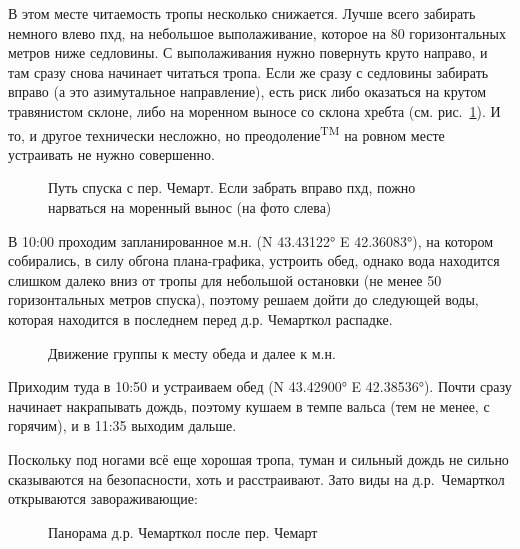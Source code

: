 В этом месте читаемость тропы несколько снижается. Лучше всего забирать немного влево пхд, на небольшое выполаживание, которое на 80 горизонтальных метров ниже седловины. С выполаживания нужно повернуть круто направо, и там сразу снова начинает читаться тропа. Если же сразу с седловины забирать вправо (а это азимутальное направление), есть риск либо оказаться на крутом травянистом склоне, либо на моренном выносе со склона хребта (см. рис.~\ref{fig:chemart_scheme}). И то, и другое технически несложно, но преодоление\textsuperscript{TM} на ровном месте устраивать не нужно совершенно.


\begin{figure}[h!]
	\centering
	\caption{Путь спуска с пер. Чемарт. Если забрать вправо пхд, пожно нарваться на моренный вынос (на фото слева)}
	\label{fig:chemart_scheme}
\end{figure}

																В 10:00 проходим запланированное м.н. (N 43.43122° E 42.36083°), на котором собирались, в силу обгона плана-графика, устроить обед, однако вода находится слишком далеко вниз от тропы для небольшой остановки (не менее 50 горизонтальных метров спуска), поэтому решаем дойти до следующей воды, которая находится в последнем перед д.р. Чемарткол распадке.
																
\begin{figure}[h!]
	\centering
	\caption{Движение группы к месту обеда и далее к м.н.}
	\label{fig:sep07_route}
\end{figure}										

																
																Приходим туда в 10:50 и устраиваем обед (N 43.42900° E 42.38536°). Почти сразу начинает накрапывать дождь, поэтому кушаем в темпе вальса (тем не менее, с горячим), и в 11:35 выходим дальше. 
																
																Поскольку под ногами всё еще хорошая тропа, туман и сильный дождь не сильно сказываются на безопасности, хоть и расстраивают. Зато виды на д.р.~Чемарткол открываются завораживающие:
																
\begin{figure}[h!]
	\centering
	\caption{Панорама д.р. Чемарткол после пер. Чемарт}
	\label{fig:chemart_panorama}
\end{figure}										

